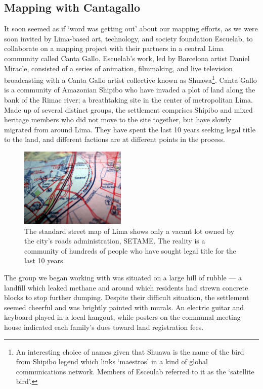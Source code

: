 \documentclass[11pt]{report}
\begin{document}
\subsection{Mapping with Cantagallo}

It soon seemed as if `word was getting out' about our mapping efforts, as we were soon invited by Lima-based art, technology, and society foundation Escuelab, to collaborate on a mapping project with their partners in a central Lima community called Canta Gallo. Escuelab's work, led by Barcelona artist Daniel Miracle, consisted of a series of animation, filmmaking, and live television broadcasting with a Canta Gallo artist collective known as Shuawa\footnote{An interesting choice of names given that Shuawa is the name of the bird from Shipibo legend which links `maestros' in a kind of global communications network. Members of Esceulab referred to it as the `satellite bird'.}. Canta Gallo is a community of Amazonian Shipibo who have invaded a plot of land along the bank of the Rimac river; a breathtaking site in the center of metropolitan Lima. Made up of several distinct groups, the settlement comprises Shipibo and mixed heritage members who did not move to the site together, but have slowly migrated from around Lima. They have spent the last 10 years seeking legal title to the land, and different factions are at different points in the process. 

\begin{figure}
	\begin{flushright}
		\includegraphics[width=0.45\textwidth]{images/canta-gallo-setame.jpg}
		\caption{The standard street map of Lima shows only a vacant lot owned by the city's roads administration, SETAME. The reality is a community of hundreds of people who have sought legal title for the last 10 years.} 
	\end{flushright}
\end{figure}

The group we began working with was situated on a large hill of rubble --- a landfill which leaked methane and around which residents had strewn concrete blocks to stop further dumping. Despite their difficult situation, the settlement seemed cheerful and was brightly painted with murals. An electric guitar and keyboard played in a local hangout, while posters on the communal meeting house indicated each family's dues toward land registration fees. 
\end{document}
